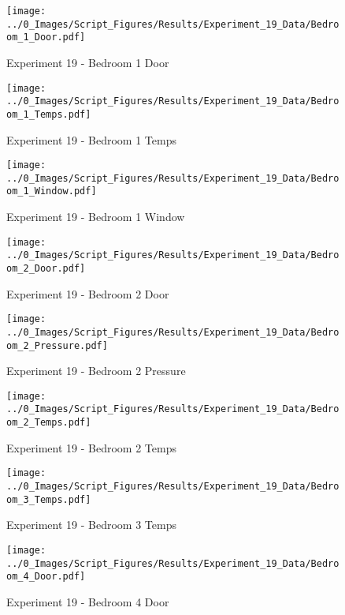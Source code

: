 	\begin{figure}[H]
		\centering
		\texttt{[image: ../0\_Images/Script\_Figures/Results/Experiment\_19\_Data/Bedroom\_1\_Door.pdf]}
		\caption[]{Experiment 19 - Bedroom 1 Door}
	\end{figure}
 

	\begin{figure}[H]
		\centering
		\texttt{[image: ../0\_Images/Script\_Figures/Results/Experiment\_19\_Data/Bedroom\_1\_Temps.pdf]}
		\caption[]{Experiment 19 - Bedroom 1 Temps}
	\end{figure}
 
	\clearpage

	\begin{figure}[H]
		\centering
		\texttt{[image: ../0\_Images/Script\_Figures/Results/Experiment\_19\_Data/Bedroom\_1\_Window.pdf]}
		\caption[]{Experiment 19 - Bedroom 1 Window}
	\end{figure}
 

	\begin{figure}[H]
		\centering
		\texttt{[image: ../0\_Images/Script\_Figures/Results/Experiment\_19\_Data/Bedroom\_2\_Door.pdf]}
		\caption[]{Experiment 19 - Bedroom 2 Door}
	\end{figure}
 
	\clearpage

	\begin{figure}[H]
		\centering
		\texttt{[image: ../0\_Images/Script\_Figures/Results/Experiment\_19\_Data/Bedroom\_2\_Pressure.pdf]}
		\caption[]{Experiment 19 - Bedroom 2 Pressure}
	\end{figure}
 

	\begin{figure}[H]
		\centering
		\texttt{[image: ../0\_Images/Script\_Figures/Results/Experiment\_19\_Data/Bedroom\_2\_Temps.pdf]}
		\caption[]{Experiment 19 - Bedroom 2 Temps}
	\end{figure}
 
	\clearpage

	\begin{figure}[H]
		\centering
		\texttt{[image: ../0\_Images/Script\_Figures/Results/Experiment\_19\_Data/Bedroom\_3\_Temps.pdf]}
		\caption[]{Experiment 19 - Bedroom 3 Temps}
	\end{figure}
 

	\begin{figure}[H]
		\centering
		\texttt{[image: ../0\_Images/Script\_Figures/Results/Experiment\_19\_Data/Bedroom\_4\_Door.pdf]}
		\caption[]{Experiment 19 - Bedroom 4 Door}
	\end{figure}
 
